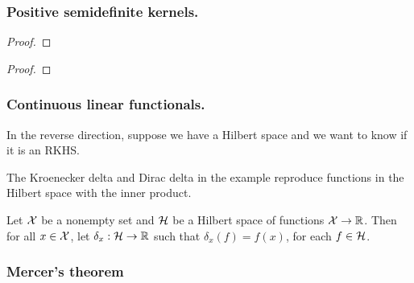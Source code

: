 

\subsubsection{Positive semidefinite kernels.}

\begin{theorem}
    \label{thm:moore-aronszajn}
    \cite{aronszajn1950theory}
    
\end{theorem}
\begin{proof}
    
\end{proof}

\begin{theorem}
    \label{thm:rk-uniqueness}
    \cite{aronszajn1950theory}
    
\end{theorem}
\begin{proof}
    
\end{proof}

\subsubsection{Continuous linear functionals.}

In the reverse direction, suppose we have a Hilbert space and we want to know if it is an RKHS.

\begin{example}
    \label{eg:r4-rkhs}
    
\end{example}

The Kroenecker delta and Dirac delta in the example reproduce functions in the Hilbert space with the inner product.

\begin{definition}
    Let \(\mathcal{X}\) be a nonempty set and \(\mathcal{H}\) be a Hilbert space of functions \(\mathcal{X} \to \mathbb{R}\).
    Then for all \(x \in \mathcal{X}\), let \(\delta_x : \mathcal{H} \to \mathbb{R}\) such that \(\delta_x(f) = f(x)\), for each \(f \in \mathcal{H}\).
\end{definition}

\subsubsection{Mercer's theorem}
\label{sub:mercers-theorem}
